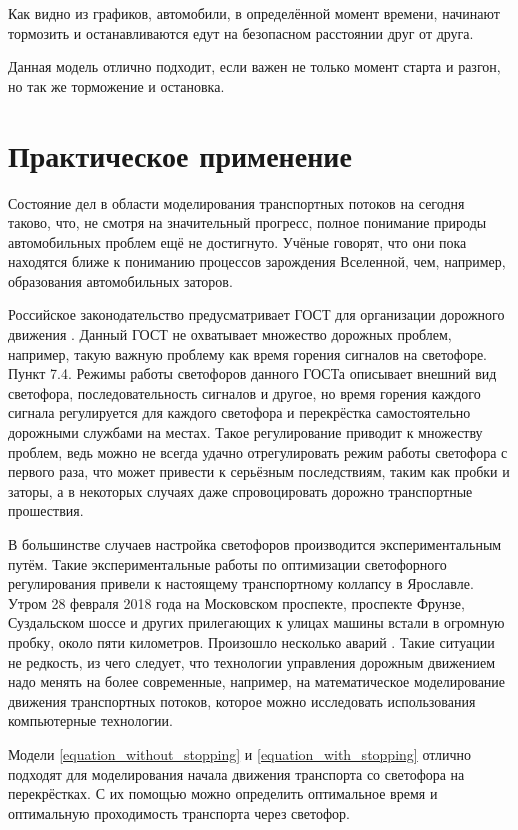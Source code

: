 \documentclass[12pt, a4paper]{extarticle}
\numberwithin{equation}{section}
\begin{document}
Как видно из графиков, автомобили, в определённой момент времени, начинают тормозить и останавливаются едут на безопасном расстоянии друг от друга. 

Данная модель отлично подходит, если важен не только момент старта и разгон, но так же торможение и остановка.
 

\section{Практическое применение} 

Состояние дел в области моделирования транспортных потоков на сегодня таково, что, не смотря на значительный прогресс, полное понимание природы автомобильных проблем ещё не достигнуто. Учёные
говорят, что они пока находятся ближе к пониманию процессов зарождения Вселенной, чем, например, образования автомобильных заторов. 

Российское законодательство предусматривает ГОСТ для организации дорожного движения \cite{Gost}. Данный ГОСТ не охватывает множество дорожных проблем, например, такую важную проблему как время горения   сигналов на светофоре. Пункт 7.4. Режимы работы светофоров данного ГОСТа описывает внешний вид светофора, последовательность сигналов и другое, но время горения каждого сигнала регулируется для каждого светофора и перекрёстка самостоятельно дорожными службами на местах. Такое регулирование приводит к множеству проблем, ведь можно не всегда удачно отрегулировать режим работы светофора с первого раза, что может привести к серьёзным последствиям, таким как пробки и заторы, а в некоторых случаях даже спровоцировать дорожно транспортные прошествия.

В большинстве случаев настройка светофоров производится экспериментальным путём. Такие экспериментальные 
работы по оптимизации светофорного регулирования привели к настоящему транспортному коллапсу в Ярославле.
Утром 28 февраля 2018 года на Московском проспекте, проспекте Фрунзе, Суздальском шоссе и других прилегающих к улицах машины встали в огромную пробку, около пяти километров. Произошло несколько аварий \cite{News}. Такие ситуации не редкость, из чего следует, что технологии управления дорожным движением надо менять на более современные, например, на математическое моделирование движения транспортных потоков, которое можно исследовать использования компьютерные технологии. 

Модели \eqref{equation_without_stopping} и \eqref{equation_with_stopping} отлично подходят для моделирования начала движения транспорта со светофора на перекрёстках. С их помощью можно определить оптимальное время и оптимальную проходимость транспорта через светофор. 
\end{document}
